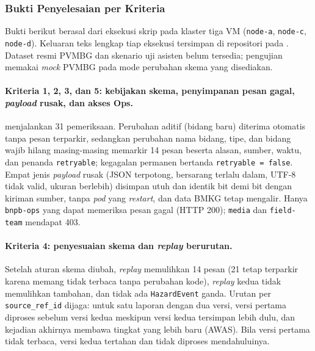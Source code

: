 \subsubsection{Bukti Penyelesaian per Kriteria}

Bukti berikut berasal dari eksekusi skrip pada klaster tiga VM (\texttt{node-a}, \texttt{node-c}, \texttt{node-d}). Keluaran teks lengkap tiap eksekusi tersimpan di repositori pada . Dataset resmi PVMBG dan skenario uji asisten belum tersedia; pengujian memakai \textit{mock} PVMBG pada mode perubahan skema yang disediakan.


\paragraph*{Kriteria 1, 2, 3, dan 5: kebijakan skema, penyimpanan pesan gagal, \textit{payload} rusak, dan akses Ops.}
 menjalankan 31 pemeriksaan. Perubahan aditif (bidang baru) diterima otomatis tanpa pesan terparkir, sedangkan perubahan nama bidang, tipe, dan bidang wajib hilang masing-masing memarkir 14 pesan beserta alasan, sumber, waktu, dan penanda \texttt{retryable}; kegagalan permanen bertanda \texttt{retryable = false}. Empat jenis \textit{payload} rusak (JSON terpotong, bersarang terlalu dalam, UTF-8 tidak valid, ukuran berlebih) disimpan utuh dan identik bit demi bit dengan kiriman sumber, tanpa \textit{pod} yang \textit{restart}, dan data BMKG tetap mengalir. Hanya \texttt{bnpb-ops} yang dapat memeriksa pesan gagal (HTTP 200); \texttt{media} dan \texttt{field-team} mendapat 403.

\paragraph*{Kriteria 4: penyesuaian skema dan \textit{replay} berurutan.}
Setelah aturan skema diubah, \textit{replay} memulihkan 14 pesan (21 tetap terparkir karena memang tidak terbaca tanpa perubahan kode), \textit{replay} kedua tidak memulihkan tambahan, dan tidak ada \texttt{HazardEvent} ganda. Urutan per \texttt{source\_ref\_id} dijaga: untuk satu laporan dengan dua versi, versi pertama diproses sebelum versi kedua meskipun versi kedua tersimpan lebih dulu, dan kejadian akhirnya membawa tingkat yang lebih baru (AWAS). Bila versi pertama tidak terbaca, versi kedua tertahan dan tidak diproses mendahuluinya.

